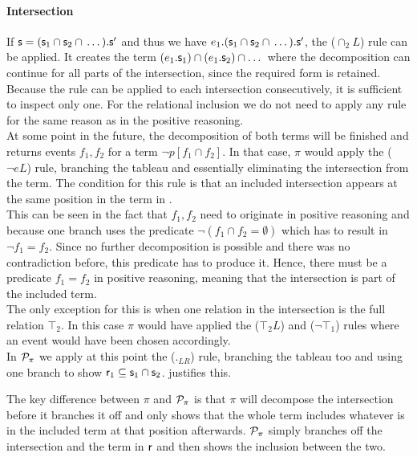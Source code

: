 \documentclass[a4paper,twoside,12pt, english]{article}
\begin{document}
\paragraph{Intersection} If $\textsf{\upshape s}=(\textsf{\upshape s}_1 \cap{} \textsf{\upshape s}_2 \cap{} \dots).\textsf{\upshape s}'$ and thus we have $e_1.(\textsf{\upshape s}_1 \cap{} \textsf{\upshape s}_2 \cap{} \dots).\textsf{\upshape s}'$, the ($\cap_2L$) rule can be applied. It creates the term $(e_1.\textsf{\upshape s}_1) \cap (e_1.\textsf{\upshape s}_2) \cap \dots$ where the decomposition can continue for all parts of the intersection, since the required form is retained.
Because the rule can be applied to each intersection consecutively, it is sufficient to inspect only one. 
For the relational inclusion we do not need to apply any rule for the same reason as in the positive reasoning. \\
At some point in the future, the decomposition of both terms will be finished and returns events $f_1,f_2$ for a term $\neg p[f_1 \cap f_2]$.
In that case, $\pi$ would apply the ($\neg eL$) rule, branching the tableau and essentially eliminating the intersection from the term. The condition for this rule is that an included intersection appears at the same position in the term in \relr{}. \\
This can be seen in the fact that $f_1,f_2$ need to originate in positive reasoning and because one branch uses the predicate $\neg (f_1 \cap f_2 = \emptyset)$ which has to result in $\neg f_1 = f_2$.
Since no further decomposition is possible and there was no contradiction before, this predicate has to produce it. Hence, there must be a predicate $f_1 = f_2$ in positive reasoning, meaning that the intersection is part of the included term. \\
The only exception for this is when one relation in the intersection is the full relation $\top_2$. In this case $\pi$ would have applied the ($\top_2L$) and ($\neg \top_1$) rules where an event would have been chosen accordingly. \\
In $\mathcal{P}_\pi$ we apply at this point the ($._{LR}$) rule, branching the tableau too and using one branch to show $\textsf{\upshape r}_1 \subseteq \textsf{\upshape s}_1 \cap \textsf{\upshape s}_2$.  justifies this. \\
\begin{mathpar} 
\end{mathpar}
The key difference between $\pi$ and $\mathcal{P}_\pi$ is that $\pi$ will decompose the intersection before it branches it off and only shows that the whole term includes whatever is in the included term at that position afterwards. $\mathcal{P}_\pi$ simply branches off the intersection and the term in $\textsf{\upshape r}$ and then shows the inclusion between the two. \\
\end{document}
